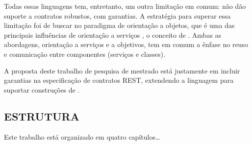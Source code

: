 Todas essas linguagens tem, entretanto, um outra limitação em comum: não dão
suporte a contratos robustos, com garantias. A estratégia para superar essa
limitação foi de buscar no paradigma de orientação a objetos, que é uma das
principais influências de orientação a serviços \cite{erl2009web},
o conceito de \designbycontract{}. Ambas as abordagens, orientação a serviços e
a objetivos, tem em comum a ênfase no reuso e comunicação entre componentes
(serviços e classes).

A proposta deste trabalho de
pesquisa de mestrado está justamente em incluir garantias na especificação de
contratos REST, extendendo a linguagem \neoidl{} para suportar construções de
\designbycontract{}.



\subsection{ESTRUTURA}
\vspace{-6mm}

Este trabalho está organizado em quatro capítulos\ldots


